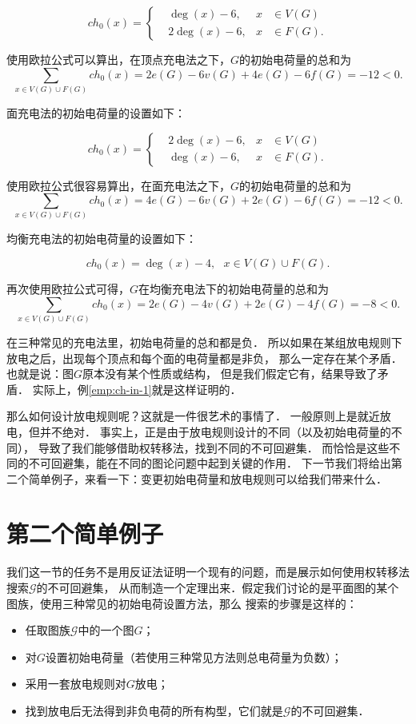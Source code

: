 \documentclass[cn,fancy,blue,11pt]{elegantbook}
\begin{document}
\[ch_0(x)=\left\{
	\begin{aligned}
		&\deg(x)-6, & x&\in V(G)\\
		&2\deg(x)-6, & x&\in F(G).
	\end{aligned}
\right.\]

使用欧拉公式可以算出，在顶点充电法之下，$G$的初始电荷量的总和为
\[\sum_{x\in V(G)\cup F(G)}ch_0(x)=2e(G)-6v(G)+4e(G)-6f(G)=-12<0.\]

面充电法的初始电荷量的设置如下：

\[ch_0(x)=\left\{
	\begin{aligned}
		&2\deg(x)-6, & x&\in V(G)\\
		&\deg(x)-6, & x&\in F(G).
	\end{aligned}
\right.\]

使用欧拉公式很容易算出，在面充电法之下，$G$的初始电荷量的总和为
\[\sum_{x\in V(G)\cup F(G)}ch_0(x)=4e(G)-6v(G)+2e(G)-6f(G)=-12<0.\]

均衡充电法的初始电荷量的设置如下：

\[ch_0(x)=\deg(x)-4,~~~x\in V(G)\cup F(G).\]

再次使用欧拉公式可得，$G$在均衡充电法下的初始电荷量的总和为
\[\sum_{x\in V(G)\cup F(G)}ch_0(x)=2e(G)-4v(G)+2e(G)-4f(G)=-8<0.\]

在三种常见的充电法里，初始电荷量的总和都是负．
所以如果在某组放电规则下放电之后，出现每个顶点和每个面的电荷量都是非负，
那么一定存在某个矛盾．
也就是说：图$G$原本没有某个性质或结构，
但是我们假定它有，结果导致了矛盾．
实际上，例\ref{emp:ch-in-1}就是这样证明的．

那么如何设计放电规则呢？这就是一件很艺术的事情了．
一般原则上是就近放电，但并不绝对．
事实上，正是由于放电规则设计的不同（以及初始电荷量的不同），
导致了我们能够借助权转移法，找到不同的不可回避集．
而恰恰是这些不同的不可回避集，能在不同的图论问题中起到关键的作用．
下一节我们将给出第二个简单例子，来看一下：变更初始电荷量和放电规则可以给我们带来什么．

\section{第二个简单例子}

我们这一节的任务不是用反证法证明一个现有的问题，而是展示如何使用权转移法搜索$\mathcal{G}$的不可回避集，
从而制造一个定理出来．假定我们讨论的是平面图的某个图族，使用三种常见的初始电荷设置方法，那么
搜索的步骤是这样的：
\begin{framed}
\begin{itemize}
	\item 任取图族$\mathcal{G}$中的一个图$G$；
	\item 对$G$设置初始电荷量（若使用三种常见方法则总电荷量为负数）；
	\item 采用一套放电规则对$G$放电；
	\item 找到放电后无法得到非负电荷的所有构型，它们就是$\mathcal{G}$的不可回避集．
\end{itemize}
\end{framed}
\end{document}
